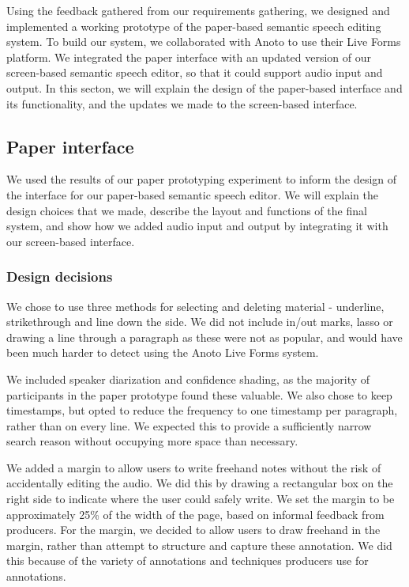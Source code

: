 



Using the feedback gathered from our requirements gathering, we designed and implemented a working prototype of the
paper-based semantic speech editing system. To build our system, we collaborated with Anoto to use their Live Forms
platform. We integrated the paper interface with an updated version of our screen-based semantic speech editor, so that
it could support audio input and output.  In this secton, we will explain the design of the paper-based interface and
its functionality, and the updates we made to the screen-based interface.

\subsection{Paper interface}

We used the results of our paper prototyping experiment to inform the design of the interface for our paper-based
semantic speech editor. We will explain the design choices that we made, describe the layout and functions of the final
system, and show how we added audio input and output by integrating it with our screen-based interface.

\subsubsection{Design decisions}

We chose to use three methods for selecting and deleting material - underline, strikethrough and line down the side.
We did not include in/out marks, lasso or drawing a line through a paragraph as these were not as popular, and would
have been much harder to detect using the Anoto Live Forms system.

We included speaker diarization and confidence shading, as the majority of participants in the paper prototype found
these valuable. We also chose to keep timestamps, but opted to reduce the frequency to one timestamp per paragraph,
rather than on every line. We expected this to provide a sufficiently narrow search reason without occupying more space
than necessary.

We added a margin to allow users to write freehand notes without the risk of accidentally editing the audio. We did
this by drawing a rectangular box on the right side to indicate where the user could safely write.
We set the margin to be approximately 25\% of the width of the page, based on informal feedback from producers.
For the margin, we decided to allow users to draw freehand in the margin, rather than attempt to structure and capture
these annotation. We did this because of the variety of annotations and techniques producers use for annotations.


